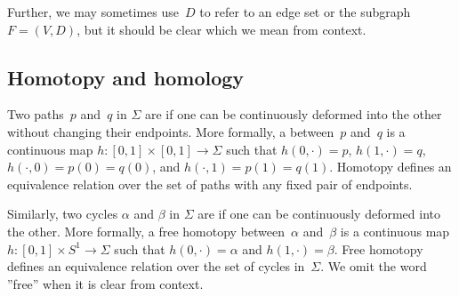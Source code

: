 \documentclass[11pt,twoside]{article}
\def\arcto{\mathord\shortrightarrow}
\begin{document}
Further, we may sometimes use~$D$ to refer to an edge set or the subgraph~$F = (V, D)$,
but it should be clear which we mean from context.



\subsection{Homotopy and homology}
\label{SS:homology}

Two paths~$p$ and~$q$ in $\Sigma$ are  if one can be continuously deformed into the other without changing their endpoints.
More formally, a  between~$p$ and~$q$ is a continuous map $h\colon {[0,1]\times [0,1] \to \Sigma}$ such that $h(0,\cdot) = p$, $h(1,\cdot) = q$, $h(\cdot, 0)=p(0)=q(0)$, and $h(\cdot,1)=p(1)=q(1)$.  Homotopy defines an equivalence relation over the set of paths with any fixed pair of endpoints.

Similarly, two cycles $\alpha$ and $\beta$ in $\Sigma$ are  if one can be continuously deformed into the other.  More formally, a free homotopy between~$\alpha$ and~$\beta$ is a continuous map $h\colon {[0,1]\times S^1 \to \Sigma}$ such that $h(0,\cdot) = \alpha$ and $h(1,\cdot) = \beta$.  Free homotopy defines an equivalence relation over the set of cycles in~$\Sigma$.  We omit the word ”free” when it is clear from context.
\end{document}
